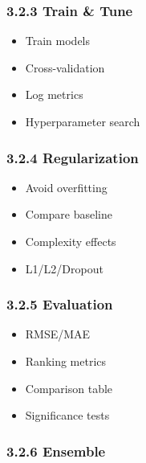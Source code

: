 \documentclass[
]{article}
\providecommand{\tightlist}{%
  \setlength{\itemsep}{0pt}\setlength{\parskip}{0pt}}
\begin{document}
\subsubsection{3.2.3 Train \& Tune}\label{train-tune}

\begin{itemize}
\tightlist
\item
  Train models\\
\item
  Cross-validation\\
\item
  Log metrics\\
\item
  Hyperparameter search \newpage
\end{itemize}

\subsubsection{3.2.4 Regularization}\label{regularization}

\begin{itemize}
\tightlist
\item
  Avoid overfitting\\
\item
  Compare baseline\\
\item
  Complexity effects\\
\item
  L1/L2/Dropout \newpage
\end{itemize}

\subsubsection{3.2.5 Evaluation}\label{evaluation}

\begin{itemize}
\tightlist
\item
  RMSE/MAE\\
\item
  Ranking metrics\\
\item
  Comparison table\\
\item
  Significance tests \newpage
\end{itemize}

\subsubsection{3.2.6 Ensemble}\label{ensemble}
\end{document}
